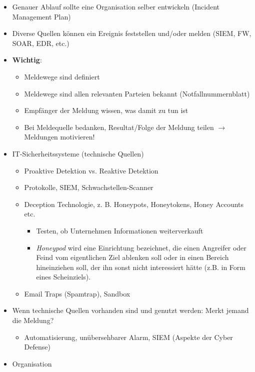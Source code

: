 \begin{itemize}
    \item Genauer Ablauf sollte eine Organisation selber entwickeln (Incident Management Plan)
    \item Diverse Quellen können ein Ereignis feststellen und/oder melden (SIEM, FW, SOAR, EDR, etc.)
    \item \textbf{Wichtig}:
    \begin{itemize}
        \item Meldewege sind definiert
        \item Meldewege sind allen relevanten Parteien bekannt (Notfallnummernblatt)
        \item Empfänger der Meldung wissen, was damit zu tun ist
        \item Bei Meldequelle bedanken, Resultat/Folge der Meldung teilen $\rightarrow$ Meldungen motivieren!
    \end{itemize}
    \item IT-Sicherheitssysteme (technische Quellen)
    \begin{itemize}
        \item Proaktive Detektion vs. Reaktive Detektion
        \item Protokolle, SIEM, Schwachstellen-Scanner
        \item Deception Technologie, z. B. Honeypots, Honeytokens, Honey Accounts etc.
        \begin{itemize}
            \item Testen, ob Unternehmen Informationen weiterverkauft
            \item \textit{Honeypod} wird eine Einrichtung bezeichnet, die einen Angreifer oder Feind vom eigentlichen Ziel ablenken soll oder in einen Bereich hineinziehen soll, der ihn sonst nicht interessiert hätte (z.B. in Form eines Scheinziels).
        \end{itemize}
        \item Email Traps (Spamtrap), Sandbox
    \end{itemize}
    \item Wenn technische Quellen vorhanden sind und genutzt werden: Merkt jemand die Meldung?
    \begin{itemize}
        \item Automatisierung, unübersehbarer Alarm, SIEM (Aspekte der Cyber Defense)
    \end{itemize}
    \item Organisation
    \begin{itemize}

\end{itemize}
\end{itemize}
